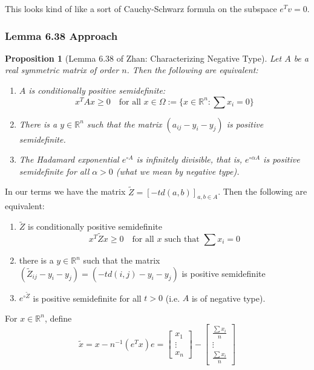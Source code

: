 \documentclass[11pt]{article}
\theoremstyle{definition}
\theoremstyle{definition}
\theoremstyle{plain}
\theoremstyle{plain}
\newtheorem*{prop}{Proposition}
\theoremstyle{plain}
\theoremstyle{definition}
\begin{document}
This looks kind of like a sort of Cauchy-Schwarz formula on the subspace $e^Tv=0$.

\subsubsection*{Lemma 6.38 Approach}
\begin{prop}[Lemma 6.38 of Zhan: Characterizing Negative Type]
Let $A$ be a real symmetric matrix of order $n$. Then the following are equivalent:
\begin{enumerate}
\item $A$ is conditionally positive semidefinite:
\begin{equation*}
x^TAx \geq 0 \quad\text{for all $x \in \Omega:=\{x \in \mathbb{R}^n : \sum x_i = 0\}$}
\end{equation*}
\item There is a $y \in \mathbb{R}^n$ such that the matrix $(a_{ij} - y_i - y_j)$ is positive semidefinite.
\item The Hadamard exponential $e^{\circ A}$ is infinitely divisible, that is, $e^{\circ \alpha A}$ is positive semidefinite for all $\alpha > 0$ (what we mean by negative type).
\end{enumerate}
\end{prop}

In our terms we have the matrix $\tilde{Z} = [-td(a,b)]_{a,b \in A}$. Then the following are equivalent:

\begin{enumerate}
\item $\tilde{Z}$ is conditionally positive semidefinite
\begin{equation*}
x^T\tilde{Z}x \geq 0 \quad\text{for all $x$ such that $\sum x_i = 0$}
\end{equation*}
\item there is a $y \in \mathbb{R}^n$ such that the matrix $(\tilde{Z}_{ij}-y_i-y_j) = (-td(i,j) - y_i - y_j)$ is positive semidefinite
\item $e^{\circ \tilde{Z}}$ is positive semidefinite for all $t > 0$ (i.e. $A$ is of negative type).
\end{enumerate}

For $x \in \mathbb{R}^n$, define
\begin{equation*}
\tilde{x} = x - n^{-1}(e^Tx)e = \begin{bmatrix} x_1 \\ \vdots \\ x_n \end{bmatrix} - \begin{bmatrix} \frac{\sum x_i}{n} \\ \vdots \\ \frac{\sum x_i}{n} \end{bmatrix}
\end{equation*}
\end{document}
